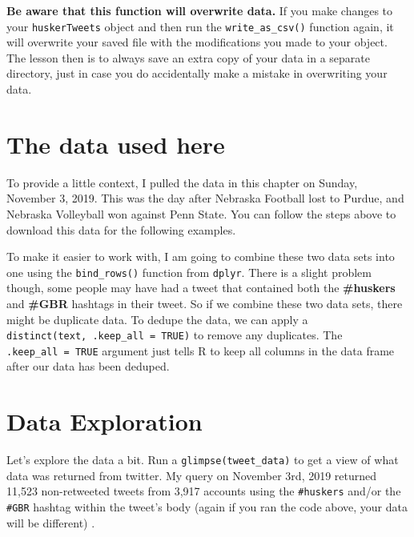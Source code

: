 \documentclass[]{book}
\newenvironment{Shaded}{\begin{snugshade}}{\end{snugshade}}
\newcommand{\DataTypeTok}[1]{\textcolor[rgb]{0.13,0.29,0.53}{#1}}
\newcommand{\KeywordTok}[1]{\textcolor[rgb]{0.13,0.29,0.53}{\textbf{#1}}}
\newcommand{\NormalTok}[1]{#1}
\newcommand{\OperatorTok}[1]{\textcolor[rgb]{0.81,0.36,0.00}{\textbf{#1}}}
\newcommand{\OtherTok}[1]{\textcolor[rgb]{0.56,0.35,0.01}{#1}}
\newcommand{\StringTok}[1]{\textcolor[rgb]{0.31,0.60,0.02}{#1}}
\begin{document}
\textbf{Be aware that this function will overwrite data.} If you make changes to your \texttt{huskerTweets} object and then run the \texttt{write\_as\_csv()} function again, it will overwrite your saved file with the modifications you made to your object. The lesson then is to always save an extra copy of your data in a separate directory, just in case you do accidentally make a mistake in overwriting your data.

\hypertarget{the-data-used-here}{%
\section{The data used here}\label{the-data-used-here}}

To provide a little context, I pulled the data in this chapter on Sunday, November 3, 2019. This was the day after Nebraska Football lost to Purdue, and Nebraska Volleyball won against Penn State. You can follow the steps above to download this data for the following examples.

To make it easier to work with, I am going to combine these two data sets into one using the \texttt{bind\_rows()} function from \texttt{dplyr}. There is a slight problem though, some people may have had a tweet that contained both the \textbf{\#huskers} and \textbf{\#GBR} hashtags in their tweet. So if we combine these two data sets, there might be duplicate data. To dedupe the data, we can apply a \texttt{distinct(text,\ .keep\_all\ =\ TRUE)} to remove any duplicates. The \texttt{.keep\_all\ =\ TRUE} argument just tells R to keep all columns in the data frame after our data has been deduped.

\begin{Shaded}
\end{Shaded}

\hypertarget{data-exploration}{%
\section{Data Exploration}\label{data-exploration}}

Let's explore the data a bit. Run a \texttt{glimpse(tweet\_data)} to get a view of what data was returned from twitter. My query on November 3rd, 2019 returned 11,523 non-retweeted tweets from 3,917 accounts using the \texttt{\#huskers} and/or the \texttt{\#GBR} hashtag within the tweet's body (again if you ran the code above, your data will be different) .
\end{document}
